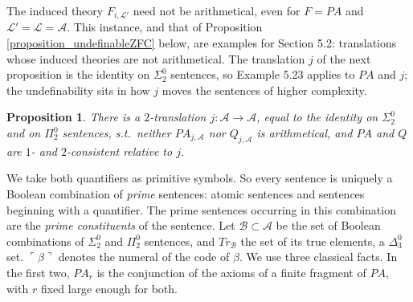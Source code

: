 \documentclass{amsart}  %
\numberwithin{equation}{section}
\newtheorem{proposition}[equation]{Proposition}
\theoremstyle{definition}
\theoremstyle{remark}
\begin{document}
The induced theory $F _{i, \mathcal{L}'}$ need not be arithmetical, even for $F = PA$ and $\mathcal{L}' = \mathcal{L} = \mathcal{A}$. This instance, and that of Proposition \ref{proposition_undefinableZFC} below, are examples for Section 5.2: translations whose induced theories are not arithmetical. The translation $j$ of the next proposition is the identity on $\Sigma ^{0} _{2}$ sentences, so Example 5.23 applies to $PA$ and $j$; the undefinability sits in how $j$ moves the sentences of higher complexity.
\begin{proposition} \label{proposition_undefinable}
There is a $2$-translation $j: \mathcal{A} \to \mathcal{A}$, equal to the identity on $\Sigma ^{0} _{2}$ and on $\Pi ^{0} _{2}$ sentences, s.t.\ neither $PA _{j, \mathcal{A}}$ nor $Q _{j, \mathcal{A}}$ is arithmetical, and $PA$ and $Q$ are $1$- and $2$-consistent relative to $j$.
\end{proposition}
We take both quantifiers as primitive symbols. So every sentence is uniquely a Boolean combination of \emph{prime} sentences: atomic sentences and sentences beginning with a quantifier. The prime sentences occurring in this combination are the \emph{prime constituents} of the sentence. Let $\mathcal{B} \subset \mathcal{A}$ be the set of Boolean combinations of $\Sigma ^{0} _{2}$ and $\Pi ^{0} _{2}$ sentences, and $Tr _{\mathcal{B}}$ the set of its true elements, a $\Delta ^{0} _{3}$ set. $\ulcorner \beta \urcorner$ denotes the numeral of the code of $\beta$. We use three classical facts. In the first two, $PA _{r}$ is the conjunction of the axioms of a finite fragment of $PA$, with $r$ fixed large enough for both.
\end{document}
